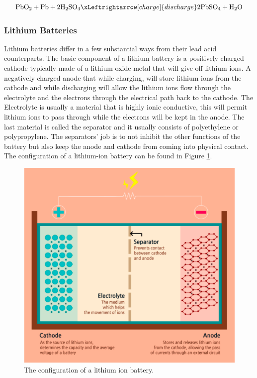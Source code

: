 \begin{equation}
    \text{PbO}_2 + \text{Pb} + 2\text{H}_2\text{SO}_4
    \xLeftrightarrow[charge]{discharge}
    2\text{PbSO}_4 + \text{H}_2\text{O}
    \label{lead-acid-eqn}
\end{equation}

\subsubsection{Lithium Batteries}
Lithium batteries differ in a few substantial ways from their lead acid counterparts. The basic component of a lithium battery is a positively charged cathode typically made of a lithium oxide metal that will give off lithium ions. A negatively charged anode that while charging, will store lithium ions from the cathode and while discharging will allow the lithium ions flow through the electrolyte and the electrons through the electrical path back to the cathode. The Electrolyte is usually a material that is highly ionic conductive, this will permit lithium ions to pass through while the electrons will be kept in the anode. The last material is called the separator and it usually consists of polyethylene or polypropylene. The separators' job is to not inhibit the other functions of the battery but also keep the anode and cathode from coming into physical contact. The configuration of a lithium-ion battery can be found in Figure \ref{lithium-ion-battery}.

\begin{figure}
    \centering
    \includegraphics[scale=0.4]{figures/lithium ion battery.png}
    \caption{The configuration of a lithium ion battery.}
    \label{lithium-ion-battery} 
\end{figure}

